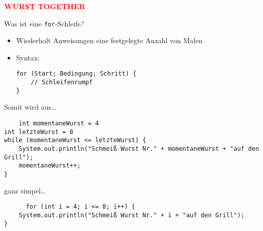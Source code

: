 \documentclass{../../presentation}
\begin{document}
\begin{frame}[plain]
    \centering
    {\Huge\bfseries\textcolor{red}{WURST TOGETHER}}
\end{frame}



\begin{frame}[fragile]{Was ist eine \texttt{for}-Schleife?}

  \begin{itemize}
    \item Wiederholt Anweisungen eine festgelegte Anzahl von Malen
    \item Syntax:
      \begin{verbatim}
for (Start; Bedingung; Schritt) {
    // Schleifenrumpf
}
\end{verbatim}
  \end{itemize}
\end{frame}



\begin{frame}[fragile]
  Somit wird aus\dots
  
  \begin{verbatim}
    int momentaneWurst = 4
int letzteWurst = 8
while (momentaneWurst <= letzteWurst) {
	System.out.println("Schmeiß Wurst Nr." + momentaneWurst + "auf den Grill");
	momentaneWurst++;
}
  \end{verbatim}
  ganz simpel\dots
  \begin{verbatim}
      for (int i = 4; i <= 8; i++) {
	System.out.println("Schmeiß Wurst Nr." + i + "auf den Grill");
}
  \end{verbatim}

\end{frame}
\end{document}
